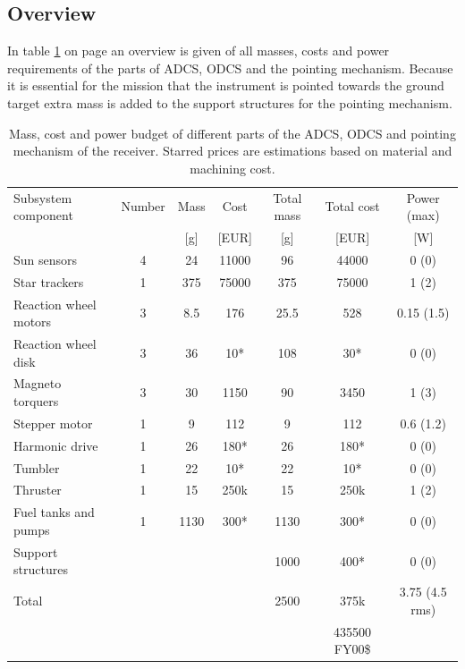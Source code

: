 \subsection{Overview}
\label{ss:recDDoverview}
In table \ref{tab:adcspointbudgetreceiver} on page \pageref{tab:adcspointbudgetreceiver} an overview is given of all masses, costs and power requirements of the parts of \ac{ADCS}, \ac{ODCS} and the pointing mechanism. Because it is essential for the mission that the instrument is pointed towards the ground target extra mass is added to the support structures for the pointing mechanism.
\begin{table}[h]
\begin{tabular}{l | c | c c | c c | c }
Subsystem component    & Number & Mass & Cost & Total mass & Total cost & Power (max)\\ 
                       &   & [g] & [EUR]& [g]  &[EUR] & [W]         \\ \hline \hline
Sun sensors            & 4 & 24  & 11000& 96   & 44000&  0 (0)      \\
Star trackers          & 1 & 375 & 75000& 375  & 75000&  1 (2)      \\ \hline
Reaction wheel motors  & 3 & 8.5 & 176  & 25.5 & 528  &  0.15 (1.5) \\
Reaction wheel disk    & 3 & 36  & 10*  & 108  & 30*  &  0 (0)      \\
Magneto torquers       & 3 & 30  & 1150 & 90   & 3450 &  1 (3)      \\ \hline
Stepper motor          & 1 & 9   & 112  & 9    & 112  &  0.6 (1.2)  \\
Harmonic drive         & 1 & 26  & 180* & 26   & 180* &  0 (0)      \\ 
Tumbler                & 1 & 22  & 10*  & 22   & 10*  &  0 (0)      \\ \hline
Thruster			   & 1 & 15  & 250k & 15   & 250k &  1 (2)      \\
Fuel tanks and pumps   & 1 & 1130 & 300*& 1130  & 300*  & 0 (0)      \\ \hline
Support structures     &	&	 &	    & 1000  & 400* & 0 (0) \\ \hline
Total & & &                             & 2500  & 375k & 3.75 (4.5 rms) \\
&&&&& 435500 FY00\$ &
\end{tabular}
\caption[Mass, cost and power budget of AODCS and pointing mechanism receiver]{Mass, cost and power budget of different parts of the \ac{ADCS}, \ac{ODCS} and pointing mechanism of the receiver. Starred prices are estimations based on material and machining cost.}
\label{tab:adcspointbudgetreceiver}
\end{table}